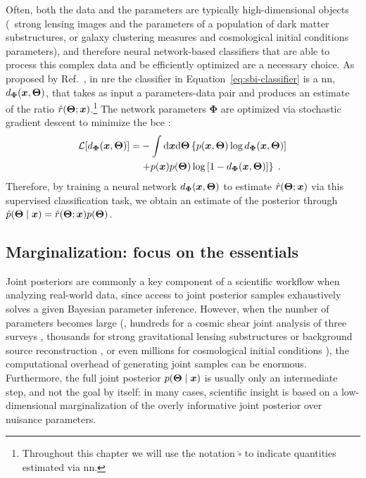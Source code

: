 Often, both the data and the parameters are typically high-dimensional objects (\eg~strong lensing images and the parameters of a population of dark matter substructures, or galaxy clustering measures and  cosmological initial conditions parameters), and therefore neural network-based classifiers that are able to process this complex data and be efficiently optimized are a necessary choice.
As proposed by Ref.~\cite{Hermans:2019ioj}, in \gls*{nre} the classifier in Equation~\eqref{eq:sbi-classifier} is a \gls*{nn},  $d_{\bm{\Phi}}(\bm{x}, \bm{\Theta})$, that takes as input a parameters-data pair and produces an estimate of the ratio $\hat{r}(\bm{\Theta};\bm{x})$.\footnote{Throughout this chapter we will use the notation $\hat{\square}$ to indicate quantities estimated via \gls*{nn}.} 
The network parameters ${\bm{\Phi}}$ are optimized via stochastic gradient descent  \cite{Murphy:book, bottou:nips, kingma2014adam} to minimize the \gls*{bce} \cite{mao2023cross}:
\begin{equation}\label{eq:sbi-bce}
\begin{split}
    \mathcal{L}[d_{\bm{\Phi}}(\bm{x}, \bm{\Theta})] = &-\int \dd \bm{x}  \dd\bm{\Theta} \left\{ p(\bm{x}, \bm{\Theta}) \log d_{\bm{\Phi}}(\bm{x}, \bm{\Theta}) ] \right. \\
    & \left. + p(\bm{x}) p(\bm{\Theta}) \log\left[ 1 - d_{\bm{\Phi}}(\bm{x}, \bm{\Theta}) \right] \right\}\; .
\end{split}
\end{equation}
Therefore, by training a neural network $d_{\bm{\Phi}}(\bm{x}, \bm{\Theta})$ to estimate $\hat{r}(\bm{\Theta}; \bm{x})$ via this supervised classification task, we obtain an estimate of the posterior through $\hat{p}(\bm{\Theta} \mid \bm{x}) = \hat{r}(\bm{\Theta}; \bm{x}) p(\bm{\Theta})$. 



\subsection{Marginalization: focus on the essentials} \label{subsec:tmnre-m} %

Joint posteriors are commonly a key component of a scientific workflow when analyzing real-world data, since access to joint posterior samples exhaustively solves a given Bayesian parameter inference. However, when the number of parameters becomes large (\eg, hundreds for a cosmic shear joint analysis of three surveys \cite{Piras:2024dml}, thousands for strong gravitational lensing substructures \cite{Montel:2022fhv, Coogan:2022cky} or background source reconstruction \cite{Karchev:2021fro}, or even millions for cosmological initial conditions \cite{Jasche:2012kq, List:2023aa}), the computational overhead of generating joint samples can be enormous. Furthermore, the full joint posterior $p(\bm{\Theta} \mid \bm{x})$ is usually only an intermediate step, and not the goal by itself: in many cases, scientific insight is based on a low-dimensional marginalization of the overly informative joint posterior over nuisance parameters.

